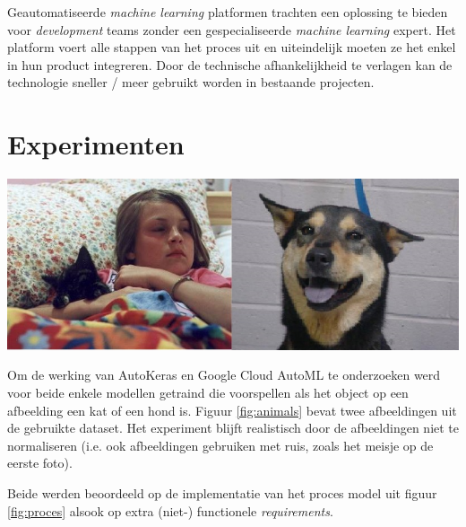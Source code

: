 \documentclass[a0,portrait]{a0poster}
\begin{document}
\begin{multicols}{2}
Geautomatiseerde \textit{machine learning} platformen trachten een oplossing te bieden voor \textit{development} teams zonder een gespecialiseerde \textit{machine learning} expert. Het platform voert alle stappen van het proces uit en uiteindelijk moeten ze het enkel in hun product integreren. Door de technische afhankelijkheid te verlagen kan de technologie sneller / meer gebruikt worden in bestaande projecten.


\color{Black} %
\color{HoGentAccent1} 
\section*{Experimenten}
\color{black}


\begin{center}\vspace{1cm}
    \includegraphics[width=1\linewidth]{./figures/animal.jpg}
    \label{fig:animals}    
\end{center}

Om de werking van AutoKeras en Google Cloud AutoML te onderzoeken werd voor beide enkele modellen getraind die voorspellen als het object op een afbeelding een kat of een hond is. Figuur \ref{fig:animals} bevat twee afbeeldingen uit de gebruikte dataset. Het experiment blijft realistisch door de afbeeldingen niet te normaliseren (i.e. ook afbeeldingen gebruiken met ruis, zoals het meisje op de eerste foto).

Beide werden beoordeeld op de implementatie van het proces model uit figuur \ref{fig:proces} alsook op extra (niet-) functionele \textit{requirements}.


\end{multicols}
\end{document}
